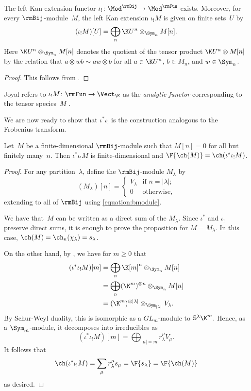 \begin{prop}\label{proposition:leftkanextension}
    The left Kan extension functor $\iota_! \colon \Mod^\rmBij \to \Mod^\rmFun$ exists. Moreover, for every $\rmBij$-module~$M$, the left Kan extension $\iota_! M$ is given on finite sets~$U$ by \[(\iota_! M)[U] = \bigoplus_{n} \K U^n \otimes_{\Sym_n} M[n].\] Here $\K U^n \otimes_{\Sym_n} M[n]$ denotes the quotient of the tensor product $\K U^n \otimes M[n]$ by the relation that $a \otimes w b \sim aw \otimes b$ for all $a \in \K U^n$, $b \in M_n$, and $w \in \Sym_n$.
\end{prop}
\begin{proof}
    This follows from \cite[Proposition~2.6.7]{MR3641124}.
\end{proof}
\begin{rema}
    Joyal refers to $\iota_! M \colon \rmFun \to \Vect_\K$ as the \emph{analytic functor} corresponding to the tensor species~$M$ \cite[Definition~4.2]{MR0927763}.
\end{rema}
We are now ready to show that $\iota^* \iota_!$ is the construction analogous to the Frobenius transform. 
\begin{prop}\label{proposition:kanfrobenius}
    Let~$M$ be a finite-dimensional $\rmBij$-module such that $M[n] = 0$ for all but finitely many~$n$. Then $\iota^*\iota_! M$ is finite-dimensional and $\F{\ch(M)} = \ch(\iota^*\iota_! M)$.
\end{prop}
\begin{proof}
    For any partition~$\lambda$, define the $\rmBij$-module $M_\lambda$ by \[(M_\lambda)[n] = \begin{cases}
        V_\lambda & \mbox{if $n = |\lambda|$;}\\
        0 & \mbox{otherwise,}
    \end{cases}\] extending to all of $\rmBij$ using \eqref{equation:bmodule}.
    
    We have that~$M$ can be written as a direct sum of the $M_\lambda$. Since $\iota^*$ and $\iota_!$ preserve direct sums, it is enough to prove the proposition for $M = M_\lambda$. In this case, $\ch(M) = \ch_n(\chi_\lambda) = s_\lambda$.

    On the other hand, by , we have for $m \geq 0$ that 
    \begin{align*}
        (\iota^*\iota_! M)[m] &= \bigoplus_{n} \K [m]^n \otimes_{\Sym_n} M[n] \\
        &= \bigoplus_{n} (\K^m)^{\otimes n} \otimes_{\Sym_n} M[n] \\
        &= (\K^m)^{\otimes |\lambda|} \otimes_{\Sym_{|\lambda|}} V_\lambda.
    \end{align*}
    By Schur-Weyl duality, this is isomorphic as a $GL_m$-module to $\mathbb{S}^\lambda \K^m$. Hence, as a $\Sym_m$-module, it decomposes into irreducibles as
    \[(\iota^* \iota_! M)[m] = \bigoplus_{|\mu| = m} r^\mu_\lambda V_\mu.\] It follows that \[\ch(\iota^* \iota_! M) = \sum_{\mu} r^{\mu}_\lambda s_\mu = \F{s_\lambda} = \F{\ch(M)}\] as desired.
\end{proof}
